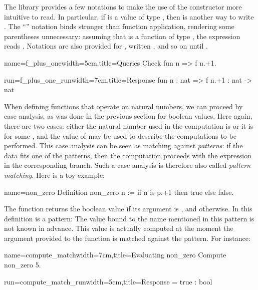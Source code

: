 The \mcbMC{} library provides a few notations to make the use of the
constructor  more intuitive to read.  In particular, if 
is a value of type , then  is another way to write
.  The ``'' notation binds stronger than function
application, rendering some parentheses unnecessary:
assuming  that  is a function of type
, the expression  reads
.  Notations are also provided for , written
, and so on until .

\begin{coq-left}{name=f_plus_one}{width=5cm,title=Queries}
Check fun n => f n.+1.
\end{coq-left}
\begin{coqout-right}{run=f_plus_one_run}{width=7cm,title=Response}
fun n : nat => f n.+1 : nat -> nat
\end{coqout-right}

When defining functions that operate on natural numbers, we
can
proceed by case analysis, as was done in the previous section for boolean
values. Here again, there are two cases: either the natural number used in
the computation is  or it is  for
some , and the value of  may be used to describe the
computations to be performed. This case analysis can be seen as
matching against \emph{patterns}: if the data fits one of
the patterns, then the computation proceeds with the expression in the
corresponding branch.  Such a case analysis is therefore also called
\emph{pattern matching}. Here is a toy example:

\begin{coq}{name=non_zero}{}
Definition non_zero n := if n is p.+1 then true else false.
\end{coq}
%

The function  returns the boolean value  if its
argument is , and  otherwise. In this definition  is a
pattern: The value bound to the name  mentioned in this pattern is not
known in advance. This value is actually computed at the moment the
argument  provided to the function is matched against the
pattern. For instance:

\begin{coq-left}{name=compute_match}{width=7cm,title=Evaluating non_zero}
Compute non_zero 5.
\end{coq-left}
\begin{coqout-right}{run=compute_match_run}{width=5cm,title=Response}
= true : bool
\end{coqout-right}

